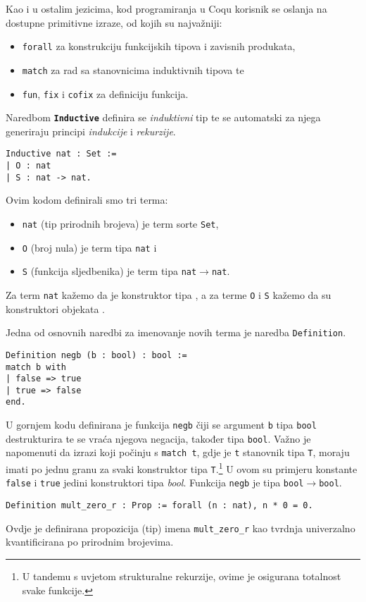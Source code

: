 Kao i u ostalim jezicima, kod programiranja u Coqu korisnik se oslanja na dostupne primitivne izraze,
od kojih su najvažniji:
\begin{itemize}
\item \texttt{forall} za konstrukciju funkcijskih tipova i zavisnih produkata, 
\item \texttt{match} za rad sa stanovnicima induktivnih tipova te
\item \texttt{fun}, \texttt{fix} i \texttt{cofix} za definiciju funkcija.
\end{itemize}

Naredbom \texttt{\textbf{Inductive}} definira se \textit{induktivni} tip te se automatski za njega generiraju principi \textit{indukcije} i \textit{rekurzije}.
\begin{verbatim}
Inductive nat : Set :=
| O : nat
| S : nat -> nat.
\end{verbatim}
\noindent Ovim kodom definirali smo tri terma:
\begin{itemize}
\item \texttt{nat} (tip prirodnih brojeva) je term sorte \texttt{Set},
\item \texttt{O} (broj nula) je term tipa \texttt{nat} i
\item \texttt{S} (funkcija sljedbenika) je term tipa \texttt{nat\(\rightarrow\)nat}.
\end{itemize}
\noindent Za term \texttt{nat} kažemo da je konstruktor tipa , a za terme \texttt{O} i \texttt{S} kažemo da su konstruktori objekata .


Jedna od osnovnih naredbi za imenovanje novih terma je naredba \texttt{Definition}.
\begin{verbatim}
Definition negb (b : bool) : bool :=
match b with
| false => true
| true => false
end.
\end{verbatim}
\noindent U gornjem kodu definirana je funkcija \texttt{negb} čiji se argument \texttt{b} tipa \texttt{bool} destrukturira te se vraća njegova negacija, također tipa \texttt{bool}.
Važno je napomenuti da izrazi koji počinju s \texttt{match t},
gdje je \texttt{t} stanovnik tipa \texttt{T}, moraju imati po jednu granu za svaki konstruktor tipa \texttt{T}.\footnote{U tandemu s uvjetom strukturalne rekurzije, ovime je osigurana totalnost svake funkcije.}
U ovom su primjeru konstante \texttt{false} i \texttt{true} jedini konstruktori tipa \textit{bool}.
Funkcija \texttt{negb} je tipa \texttt{bool\(\rightarrow\)bool}.
\begin{verbatim}
Definition mult_zero_r : Prop := forall (n : nat), n * 0 = 0.
\end{verbatim}
\noindent Ovdje je definirana propozicija (tip) imena \texttt{mult\_zero\_r} kao tvrdnja univerzalno kvantificirana po prirodnim brojevima.


